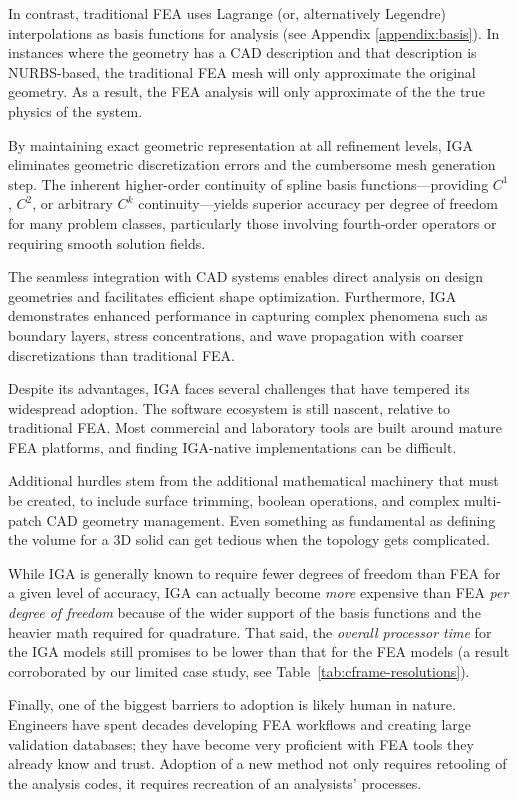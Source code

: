 \documentclass[12pt,report,justified]{SANDreport}
\begin{document}
In contrast, traditional FEA uses Lagrange (or, alternatively Legendre) interpolations as 
basis functions for analysis (see Appendix \ref{appendix:basis}).  In instances where the geometry has a CAD description and 
that description is NURBS-based, the traditional FEA mesh will only approximate
the original geometry.  As a result, the FEA analysis will only approximate of the
the true physics of the system.

By maintaining exact geometric representation at all refinement levels, IGA eliminates geometric discretization errors and the cumbersome mesh generation step. The inherent higher-order continuity of spline basis functions—providing $C^1$, $C^2$, or arbitrary $C^k$ continuity—yields superior accuracy per degree of freedom for many problem classes, particularly those involving fourth-order operators or requiring smooth solution fields. 

The seamless integration with CAD systems enables direct analysis on design geometries and facilitates efficient shape optimization. Furthermore, IGA demonstrates enhanced performance in capturing complex phenomena such as boundary layers, stress concentrations, and wave propagation with coarser discretizations than traditional FEA.

Despite its advantages, IGA faces several challenges that have tempered its widespread adoption.
The software ecosystem is still nascent, relative to traditional FEA. 
Most commercial and laboratory tools are built
around mature FEA platforms, and finding IGA-native implementations can be difficult.

Additional hurdles stem from the additional mathematical machinery that must be created,
to include surface trimming, boolean operations, and complex multi-patch CAD geometry management.
Even something as fundamental as defining the volume for a 3D solid can get tedious when
the topology gets complicated.

While IGA is generally known to require fewer degrees of freedom than FEA for a given
level of accuracy, IGA can actually become {\em more} expensive than FEA {\em per degree of freedom}
because of the wider support of the basis functions and the heavier math required for
quadrature. That said, the {\em overall processor time} for the IGA models still promises to be lower than that for the FEA models (a result corroborated by our limited case study, see Table~\ref{tab:cframe-resolutions}).

Finally, one of the biggest barriers to adoption is likely human in nature.  
Engineers have spent decades developing FEA workflows and creating large validation
databases; they have become very proficient with FEA tools they already know and trust. 
Adoption of a new method not only requires retooling of the analysis codes,
it requires recreation of an analysists' processes.
\end{document}
